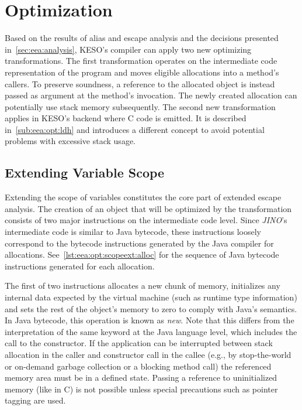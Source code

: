 	\section{Optimization}
		\label{sec:eea:opt}
		Based on the results of alias and escape analysis and the decisions presented in~\cref{sec:eea:analysis}, KESO's
		compiler can apply two new optimizing transformations. The first transformation operates on the intermediate code
		representation of the program and moves eligible allocations into a method's callers. To preserve soundness,
		a reference to the allocated object is instead passed as argument at the method's invocation. The newly created
		allocation can potentially use stack memory subsequently. The second new transformation applies in KESO's backend
		where C code is emitted. It is described in~\cref{sub:eea:opt:ldh} and introduces a different concept to avoid
		potential problems with excessive stack usage.

		\subsection{Extending Variable Scope}
			\label{sub:eea:opt:scopeext}
			Extending the scope of variables constitutes the core part of extended escape analysis. The creation of an object
			that will be optimized by the transformation consists of two major instructions on the intermediate code level.
			Since \emph{JINO}'s intermediate code is similar to Java bytecode, these instructions loosely correspond to the
			bytecode instructions generated by the Java compiler for allocations. See~\cref{lst:eea:opt:scopeext:alloc} for
			the sequence of Java bytecode instructions generated for each allocation.


			The first of two instructions allocates a new chunk of memory, initializes any internal data expected by the
			virtual machine (such as runtime type information) and sets the rest of the object's memory to zero to comply with
			Java's semantics. In Java bytecode, this operation is known as \emph{new}. Note that this differs from the
			interpretation of the same keyword at the Java language level, which includes the call to the constructor. If the
			application can be interrupted between stack allocation in the caller and constructor call in the callee (e.g., by
			stop-the-world or on-demand garbage collection or a blocking method call) the referenced memory area must be in
			a defined state. Passing a reference to uninitialized memory (like in C) is not possible unless special
			precautions such as pointer tagging are used.

